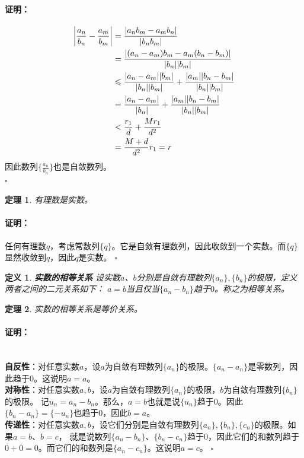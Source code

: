 \documentclass[12pt,UTF8]{ctexbook}
\newtheorem{df}{定义}[section]
\newtheorem{tm}{定理}[section]
\newenvironment{proof2}{\paragraph{\textbf{证明：}}}{\hfill$\square$}
\begin{document}
\begin{appendix}
\begin{proof2}
\begin{align}
        \left|\frac{a_n}{b_n} - \frac{a_m}{b_m}\right| &= \frac{|a_nb_m - a_mb_n|}{|b_nb_m|} \notag \\
        &= \frac{|(a_n - a_m)b_m - a_m(b_n - b_m)|}{|b_n||b_m|} \notag \\
        &\leqslant \frac{|a_n - a_m||b_m|}{|b_n||b_m|} + \frac{|a_m||b_n - b_m|}{|b_n||b_m|}\notag \\
        &= \frac{|a_n - a_m|}{|b_n|} + \frac{|a_m||b_n - b_m|}{|b_n||b_m|} \notag \\
        &< \frac{r_1}{d} + \frac{Mr_1}{d^2} \notag \\
        &= \frac{M+d}{d^2} r_1 = r \notag
    \end{align} 
    因此数列$\{\frac{a_n}{b_n}\}$也是自敛数列。\\
\end{proof2}

\begin{tm}\label{tm:a-1-5}
    有理数是实数。
\end{tm}
\begin{proof2}
    任何有理数$q$，考虑常数列$\{q\}$。它是自敛有理数列，因此收敛到一个实数。而$\{q\}$显然收敛到$q$，因此$q$是实数。
\end{proof2}

\begin{df}\textbf{实数的相等关系}
    设实数$a$、$b$分别是自敛有理数列$\{a_n\}, \{b_n\}$的极限，定义两者之间的二元关系如下：
    $a = b$当且仅当$\{a_n - b_n\}$趋于$0$。称之为相等关系。
\end{df}

\begin{tm}\label{tm:a-1-10}
    实数的相等关系是等价关系。
\end{tm}
\begin{proof2}
    \mbox{} \\
    \textbf{自反性}：对任意实数$a$，设$a$为自敛有理数列$\{a_n\}$的极限。$\{a_n - a_n\}$是零数列，因此趋于$0$。这说明$a = a$。\\
    \textbf{对称性}：对任意实数$a, b$，设$a$为自敛有理数列$\{a_n\}$的极限，$b$为自敛有理数列$\{b_n\}$的极限。
    记$u_n = a_n - b_n$。那么，$a = b$也就是说$\{u_n\}$趋于$0$。因此$\{b_n - a_n\} = \{-u_n\}$也趋于$0$，因此$b = a$。\\
    \textbf{传递性}：对任意实数$a, b$，设它们分别是自敛有理数列$\{a_n\}, \{b_n\}, \{c_n\}$的极限。如果$a=b$、$b=c$，
    就是说数列$\{a_n - b_n\}$、$\{b_n - c_n\}$趋于$0$，因此它们的和数列趋于$0+0=0$。而它们的和数列是$\{a_n - c_n\}$。这说明$a=c$。
\end{proof2}


\end{appendix}
\end{document}
